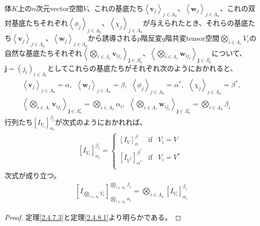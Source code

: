 \documentclass[dvipdfmx]{jsarticle}
\begin{document}
\begin{thm}\label{2.4.8.2}
体$K$上の$n$次元vector空間$V$、これの基底たち$\left\langle \mathbf{v}_{j} \right\rangle_{j \in \varLambda_{n}}$、$\left\langle \mathbf{w}_{j} \right\rangle_{j \in \varLambda_{n}}$、これの双対基底たちそれぞれ$\left\langle \phi_{j} \right\rangle_{j \in \varLambda_{n}}$、$\left\langle \chi_{j} \right\rangle_{j \in \varLambda_{n}}$が与えられたとき、それらの基底たち$\left\langle \mathbf{v}_{j} \right\rangle_{j \in \varLambda_{n}}$、$\left\langle \mathbf{w}_{j} \right\rangle_{j \in \varLambda_{n}}$から誘導される$p$階反変$q$階共変tensor空間$\bigotimes_{i \in \varLambda_{r}} V_{i}$の自然な基底たちそれぞれ$\left\langle \bigotimes_{i \in \varLambda_{r}} \mathbf{v}_{ij_{i}} \right\rangle_{\mathbf{j} \in \varLambda_{n}^{r}}$、$\left\langle \bigotimes_{i \in \varLambda_{r}} \mathbf{w}_{ij_{i}} \right\rangle_{\mathbf{j} \in \varLambda_{n}^{r}}$について、$\mathbf{j}=\left( j_{i} \right)_{i \in \varLambda_{r}}$としてこれらの基底たちがそれぞれ次のようにおかれると、
\begin{align*}
\left\langle \mathbf{v}_{j} \right\rangle_{j \in \varLambda_{n}} = \alpha,\ \ \left\langle \mathbf{w}_{j} \right\rangle_{j \in \varLambda_{n}} = \beta,\ \ \left\langle \phi_{j} \right\rangle_{j \in \varLambda_{n}} = \alpha^{*},\ \ \left\langle \chi_{j} \right\rangle_{j \in \varLambda_{n}} = \beta^{*},\\
\left\langle \bigotimes_{i \in \varLambda_{r}} \mathbf{v}_{ij_{i}} \right\rangle_{\mathbf{j} \in \varLambda_{n}^{r}} = \bigotimes_{i \in \varLambda_{n}} \alpha_{i},\ \ \left\langle \bigotimes_{i \in \varLambda_{r}} \mathbf{w}_{ij_{i}} \right\rangle_{\mathbf{j} \in \varLambda_{n}^{r}} = \bigotimes_{i \in \varLambda_{n}} \beta_{i}
\end{align*}
行列たち$\left[ I_{V_{i}} \right]^{\beta_{i}}_{\alpha_{i}}$が次式のようにおかれれば、
\begin{align*}
\left[ I_{V_{i}} \right]^{\beta_{i}}_{\alpha_{i}} = \left\{ \begin{matrix}
\left[ I_{V} \right]^{\beta}_{\alpha} & \mathrm{if} & V_{i} = V \\
\left[ I_{V^{*}} \right]^{\beta^{*}}_{\alpha^{*}} & \mathrm{if} & V_{i} = V^{*} \\
\end{matrix} \right.\ 
\end{align*}
次式が成り立つ。
\begin{align*}
\left[ I_{\bigotimes_{i \in \varLambda_{n}} V_{i}} \right]^{\bigotimes_{i \in \varLambda_{n}} \beta_{i}}_{\bigotimes_{i \in \varLambda_{n}} \alpha_{i}} = \bigotimes_{i \in \varLambda_{n}} \left[ I_{V_{i}} \right]^{\beta_{i}}_{\alpha_{i}}
\end{align*}
\end{thm}
\begin{proof} 定理\ref{2.4.7.3}と定理\ref{2.4.8.1}より明らかである。
\end{proof}
\end{document}
